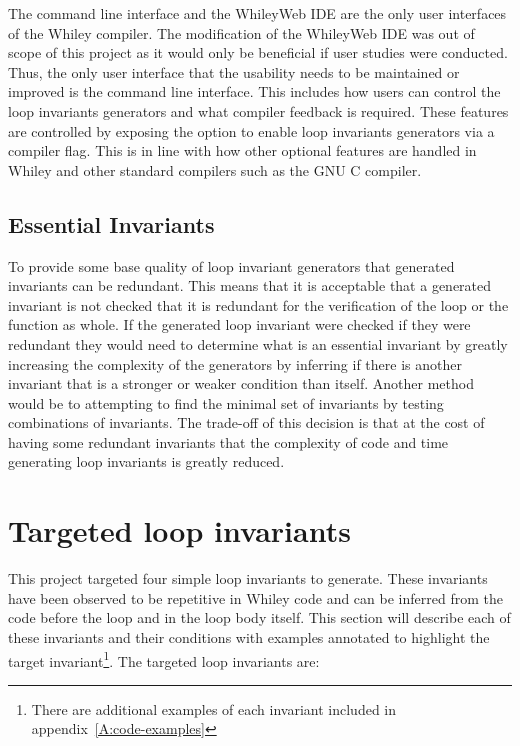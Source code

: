 The command line interface and the WhileyWeb IDE are the only user interfaces
of the Whiley compiler.
The modification of the WhileyWeb IDE was out of scope of this project as it
would only be beneficial if user studies were conducted.
Thus, the only user interface that the usability needs to be maintained or
improved is the command line interface.
This includes how users can control the loop invariants generators and what
compiler feedback is required.
These features are controlled by exposing the option to enable 
loop invariants generators via a compiler flag.
This is in line with how other optional features are handled in Whiley and
other standard compilers such as the GNU C compiler.

\subsection{Essential Invariants}\label{s:essential-inv}

To provide some base quality of loop invariant generators that generated invariants 
can be redundant.
This means that it is acceptable that a generated invariant is not
checked that it is redundant for the verification of the loop or the function
as whole.
If the generated loop invariant were checked if they were redundant
they would need to determine what is an essential invariant by greatly increasing
the complexity of the generators by inferring if there is another invariant
that is a stronger or weaker condition than itself.
Another method would be to attempting to find the
minimal set of invariants by testing combinations of invariants.
The trade-off of this decision is that at the cost of having some redundant
invariants that the complexity of code and time generating loop invariants is
greatly reduced.

\section{Targeted loop invariants}\label{s:target-loop-inv}

This project targeted four simple loop invariants to generate.
These invariants have been observed to be repetitive in Whiley code and 
can be inferred from the code before the loop and  in the loop body itself.
This section will describe each of these invariants and their conditions
with examples annotated to highlight the target invariant\footnote{There are additional examples of each invariant included in appendix~\ref{A:code-examples}}.
The targeted loop invariants are:

